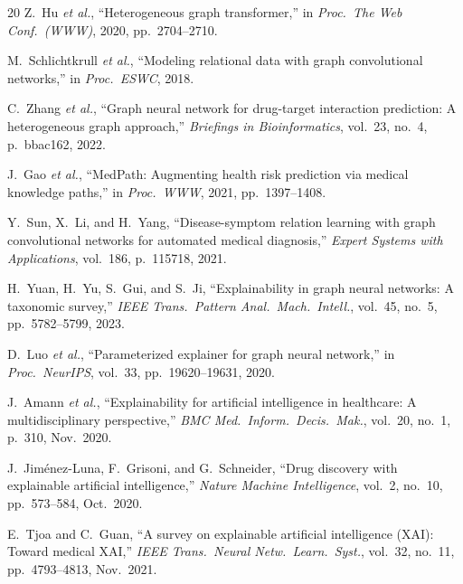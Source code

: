\documentclass[conference]{IEEEtran}
\begin{document}
\begin{thebibliography}{20}
Z.~Hu \textit{et al.},
``Heterogeneous graph transformer,''
in \textit{Proc.\ The Web Conf.\ (WWW)}, 2020, pp.~2704--2710.

M.~Schlichtkrull \textit{et al.},
``Modeling relational data with graph convolutional networks,''
in \textit{Proc.\ ESWC}, 2018.

C.~Zhang \textit{et al.},
``Graph neural network for drug-target interaction prediction:
A heterogeneous graph approach,''
\textit{Briefings in Bioinformatics}, vol.~23, no.~4, p.~bbac162,
2022.

J.~Gao \textit{et al.},
``MedPath: Augmenting health risk prediction via medical knowledge
paths,''
in \textit{Proc.\ WWW}, 2021, pp.~1397--1408.

Y.~Sun, X.~Li, and H.~Yang,
``Disease-symptom relation learning with graph convolutional networks
for automated medical diagnosis,''
\textit{Expert Systems with Applications}, vol.~186, p.~115718, 2021.

H.~Yuan, H.~Yu, S.~Gui, and S.~Ji,
``Explainability in graph neural networks: A taxonomic survey,''
\textit{IEEE Trans.\ Pattern Anal.\ Mach.\ Intell.}, vol.~45, no.~5,
pp.~5782--5799, 2023.

D.~Luo \textit{et al.},
``Parameterized explainer for graph neural network,''
in \textit{Proc.\ NeurIPS}, vol.~33, pp.~19620--19631, 2020.

J.~Amann \textit{et al.},
``Explainability for artificial intelligence in healthcare:
A multidisciplinary perspective,''
\textit{BMC Med.\ Inform.\ Decis.\ Mak.}, vol.~20, no.~1, p.~310,
Nov.~2020.

J.~Jim\'enez-Luna, F.~Grisoni, and G.~Schneider,
``Drug discovery with explainable artificial intelligence,''
\textit{Nature Machine Intelligence}, vol.~2, no.~10, pp.~573--584,
Oct.~2020.

E.~Tjoa and C.~Guan,
``A survey on explainable artificial intelligence (XAI):
Toward medical XAI,''
\textit{IEEE Trans.\ Neural Netw.\ Learn.\ Syst.}, vol.~32, no.~11,
pp.~4793--4813, Nov.~2021.

\end{thebibliography}
\end{document}
